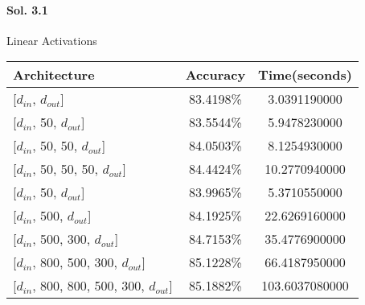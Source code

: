 \documentclass[]{report}
\begin{document}
\paragraph{Sol. 3.1}
	Linear Activations
	\begin{center}
		\begin{tabular}{l|c|c}
			\hline
			 Architecture                        & Accuracy   &   Time(seconds) \\
			\hline
			 {[$d_{in}$, $d_{out}$]}                      & 83.4198\%   &    3.0391190000 \\
			 {[$d_{in}$, 50, $d_{out}$]}                  & 83.5544\%   &    5.9478230000 \\
			 {[$d_{in}$, 50, 50, $d_{out}$]}              & 84.0503\%   &    8.1254930000 \\
			 {[$d_{in}$, 50, 50, 50, $d_{out}$]}          & 84.4424\%   &   10.2770940000 \\
			 {[$d_{in}$, 50, $d_{out}$]}                  & 83.9965\%   &    5.3710550000 \\
			 {[$d_{in}$, 500, $d_{out}$]}                 & 84.1925\%   &   22.6269160000 \\
			 {[$d_{in}$, 500, 300, $d_{out}$]}            & 84.7153\%   &   35.4776900000 \\
			 {[$d_{in}$, 800, 500, 300, $d_{out}$]}       & 85.1228\%   &   66.4187950000 \\
			 {[$d_{in}$, 800, 800, 500, 300, $d_{out}$]}  & 85.1882\%   &  103.6037080000 \\
			\hline
		\end{tabular}
	\end{center}
\end{document}
